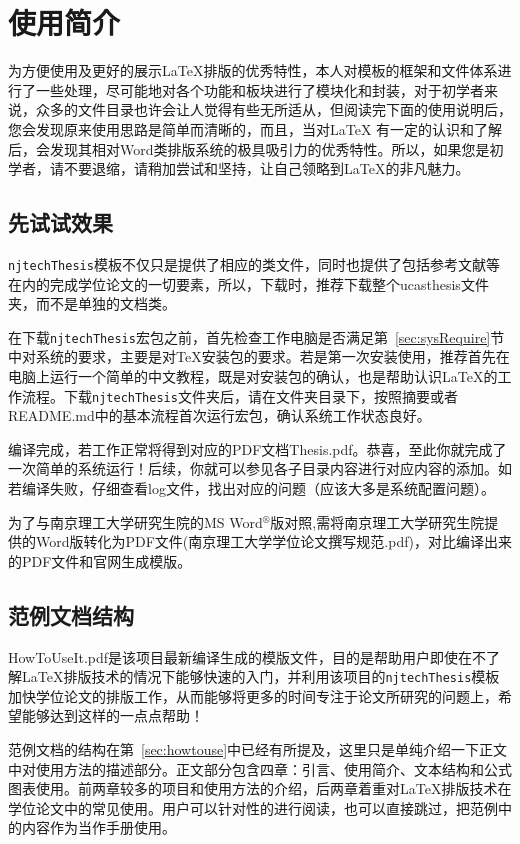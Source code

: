 
\chapter{使用简介}
\label{chap:guide}

为方便使用及更好的展示\LaTeX{}排版的优秀特性，本人对模板的框架和文件体系进行了一些处理，尽可能地对各个功能和板块进行了模块化和封装，对于初学者来说，众多的文件目录也许会让人觉得有些无所适从，但阅读完下面的使用说明后，您会发现原来使用思路是简单而清晰的，而且，当对\LaTeX{} 有一定的认识和了解后，会发现其相对Word类排版系统的极具吸引力的优秀特性。所以，如果您是初学者，请不要退缩，请稍加尝试和坚持，让自己领略到\LaTeX{}的非凡魅力。

\section{先试试效果}

\texttt{njtechThesis}模板不仅只是提供了相应的类文件，同时也提供了包括参考文献等在内的完成学位论文的一切要素，所以，下载时，推荐下载整个ucasthesis文件夹，而不是单独的文档类。

在下载\texttt{njtechThesis}宏包之前，首先检查工作电脑是否满足第~\ref{sec:sysRequire}节中对系统的要求，主要是对\TeX{}安装包的要求。若是第一次安装使用，推荐首先在电脑上运行一个简单的中文教程，既是对安装包的确认，也是帮助认识\LaTeX{}的工作流程。下载\texttt{njtechThesis}文件夹后，请在文件夹目录下，按照摘要或者README.md中的基本流程首次运行宏包，确认系统工作状态良好。

编译完成，若工作正常将得到对应的PDF文档Thesis.pdf。恭喜，至此你就完成了一次简单的系统运行！后续，你就可以参见各子目录内容进行对应内容的添加。如若编译失败，仔细查看log文件，找出对应的问题（应该大多是系统配置问题）。

为了与南京理工大学研究生院的MS Word$^{\circledR}$版对照,需将南京理工大学研究生院提供的Word版转化为PDF文件(南京理工大学学位论文撰写规范.pdf)，对比编译出来的PDF文件和官网生成模版。

\section{范例文档结构}
\label{sec:example}

HowToUseIt.pdf是该项目最新编译生成的模版文件，目的是帮助用户即使在不了解\LaTeX{}排版技术的情况下能够快速的入门，并利用该项目的\texttt{njtechThesis}模板加快学位论文的排版工作，从而能够将更多的时间专注于论文所研究的问题上，希望能够达到这样的一点点帮助！

范例文档的结构在第~\ref{sec:howtouse}中已经有所提及，这里只是单纯介绍一下正文中对使用方法的描述部分。正文部分包含四章：引言、使用简介、文本结构和公式图表使用。前两章较多的项目和使用方法的介绍，后两章着重对\LaTeX{}排版技术在学位论文中的常见使用。用户可以针对性的进行阅读，也可以直接跳过，把范例中的内容作为当作手册使用。




